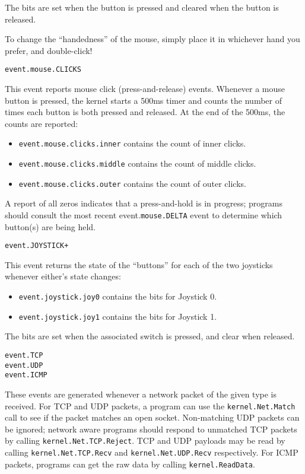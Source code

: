 The bits are set when the button is pressed and cleared when the button is released.

To change the ``handedness'' of the mouse, simply place it in whichever hand you prefer, and double-click!  

\begin{verbatim}
event.mouse.CLICKS
\end{verbatim}

This event reports mouse click (press-and-release) events.  Whenever a mouse button is pressed, the kernel starts a 500ms timer and counts the number of times each button is both pressed and released.  At the end of the 500ms, the counts are reported:

\begin{itemize}
\item \verb+event.mouse.clicks.inner+ contains the count of inner clicks.
\item \verb+event.mouse.clicks.middle+ contains the count of middle clicks.
\item \verb+event.mouse.clicks.outer+ contains the count of outer clicks.
\end{itemize}

A report of all zeros indicates that a press-and-hold is in progress; programs should consult the most recent event.\verb+mouse.DELTA+ event to determine which button(s) are being held. 

\begin{verbatim}
event.JOYSTICK+
\end{verbatim}

This event returns the state of the ``buttons'' for each of the two joysticks whenever either's state changes:

\begin{itemize}
\item \verb+event.joystick.joy0+ contains the bits for Joystick 0.
\item \verb+event.joystick.joy1+ contains the bits for Joystick 1.
\end{itemize}

The bits are set when the associated switch is pressed, and clear when released.

\begin{verbatim}
event.TCP
event.UDP
event.ICMP
\end{verbatim}

These events are generated whenever a network packet of the given type is received.  For TCP and UDP packets, a program can use the \verb+kernel.Net.Match+ call to see if the packet matches an open socket.  Non-matching UDP packets can be ignored; network aware programs should respond to unmatched TCP packets by calling \verb+kernel.Net.TCP.Reject+. TCP and UDP payloads may be read by calling \verb+kernel.Net.TCP.Recv+ and \verb+kernel.Net.UDP.Recv+ respectively.  For ICMP packets, programs can get the raw data by calling \verb+kernel.ReadData+.   


